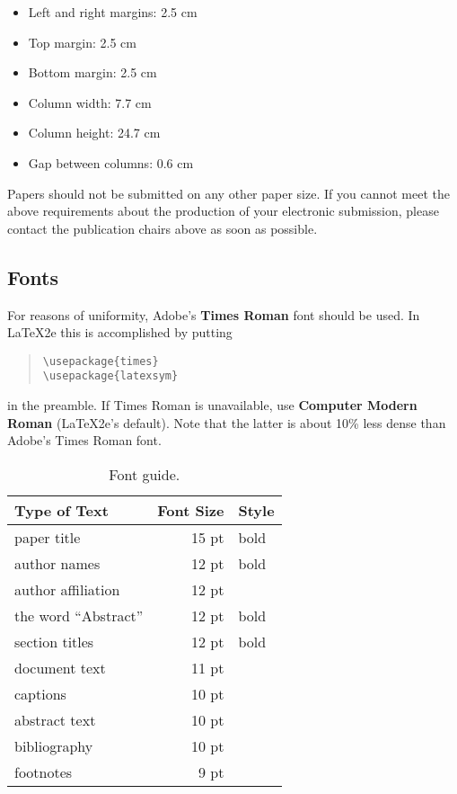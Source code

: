 \documentclass[11pt,a4paper]{article}
\begin{document}
\begin{itemize}
\item Left and right margins: 2.5 cm
\item Top margin: 2.5 cm
\item Bottom margin: 2.5 cm
\item Column width: 7.7 cm
\item Column height: 24.7 cm
\item Gap between columns: 0.6 cm
\end{itemize}

\noindent Papers should not be submitted on any other paper size.
 If you cannot meet the above requirements about the production of 
 your electronic submission, please contact the publication chairs 
 above as soon as possible.

\subsection{Fonts}

For reasons of uniformity, Adobe's {\bf Times Roman} font should be
used. In \LaTeX2e{} this is accomplished by putting

\begin{quote}
\begin{verbatim}
\usepackage{times}
\usepackage{latexsym}
\end{verbatim}
\end{quote}
in the preamble. If Times Roman is unavailable, use {\bf Computer
  Modern Roman} (\LaTeX2e{}'s default).  Note that the latter is about
  10\% less dense than Adobe's Times Roman font.

\begin{table}[t!]
\begin{center}
\begin{tabular}{|l|rl|}
\hline \bf Type of Text & \bf Font Size & \bf Style \\ \hline
paper title & 15 pt & bold \\
author names & 12 pt & bold \\
author affiliation & 12 pt & \\
the word ``Abstract'' & 12 pt & bold \\
section titles & 12 pt & bold \\
document text & 11 pt  &\\
captions & 10 pt & \\
abstract text & 10 pt & \\
bibliography & 10 pt & \\
footnotes & 9 pt & \\
\hline
\end{tabular}
\end{center}
\caption{\label{font-table} Font guide. }
\end{table}
\end{document}
